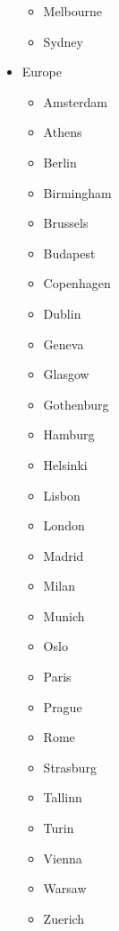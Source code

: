 \documentclass{article}
\begin{document}
\begin{itemize}
\begin{itemize}
        \item Melbourne
        \item Sydney
    \end{itemize}
    \item Europe
    \begin{itemize}
        \item Amsterdam
        \item Athens
        \item Berlin
        \item Birmingham
        \item Brussels
        \item Budapest
        \item Copenhagen
        \item Dublin
        \item Geneva
        \item Glasgow
        \item Gothenburg
        \item Hamburg
        \item Helsinki
        \item Lisbon
        \item London
        \item Madrid
        \item Milan
        \item Munich
        \item Oslo
        \item Paris
        \item Prague
        \item Rome
        \item Strasburg
        \item Tallinn
        \item Turin
        \item Vienna
        \item Warsaw
        \item Zuerich
    \end{itemize}
\end{itemize}




\medskip

\printbibliography
\end{document}
